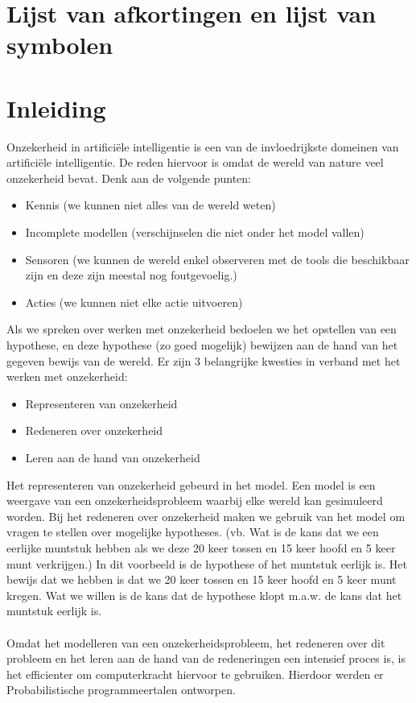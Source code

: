 \documentclass[12pt,a4paper,oneside]{book}
\begin{document}
\chapter{Lijst van afkortingen en lijst van symbolen}
\tableofcontents


\newpage
\mainmatter
\setcounter{page}{0}
\chapter{Inleiding}
Onzekerheid in artifici\"{e}le intelligentie is een van de invloedrijkste domeinen van artifici\"{e}le intelligentie. De reden hiervoor is omdat de wereld van nature veel onzekerheid bevat. Denk aan de volgende punten:
\begin{itemize}
	\item Kennis (we kunnen niet alles van de wereld weten)
	\item Incomplete modellen (verschijnselen die niet onder het model vallen)
	\item Sensoren (we kunnen de wereld enkel observeren met de tools die beschikbaar zijn en deze zijn meestal nog foutgevoelig.)
	\item Acties (we kunnen niet elke actie uitvoeren)
\end{itemize}
Als we spreken over werken met onzekerheid bedoelen we het opstellen van een hypothese, en deze hypothese (zo goed mogelijk) bewijzen aan de hand van het gegeven bewijs van de wereld.
Er zijn 3 belangrijke kwesties in verband met het werken met onzekerheid:
\begin{itemize}
	\item Representeren van onzekerheid
	\item Redeneren over onzekerheid
	\item Leren aan de hand van onzekerheid
\end{itemize}
Het representeren van onzekerheid gebeurd in het model. Een model is een weergave van een onzekerheidsprobleem waarbij elke wereld kan gesimuleerd worden.
Bij het redeneren over onzekerheid maken we gebruik van het model om vragen te stellen over mogelijke hypotheses. 
(vb. Wat is de kans dat we een eerlijke muntstuk hebben als we deze 20 keer tossen en 15 keer hoofd en 5 keer munt verkrijgen.)
In dit voorbeeld is de hypothese of het muntstuk eerlijk is. Het bewijs dat we hebben is dat we 20 keer tossen en 15 keer hoofd en 5 keer munt kregen. Wat we willen is de kans dat de hypothese klopt m.a.w. de kans dat het muntstuk eerlijk is.
\\\\
Omdat het modelleren van een onzekerheidsprobleem, het redeneren over dit probleem en het leren aan de hand van de redeneringen een intensief proces is, is het efficienter om computerkracht hiervoor te gebruiken. Hierdoor werden er Probabilistische programmeertalen ontworpen.
\end{document}
